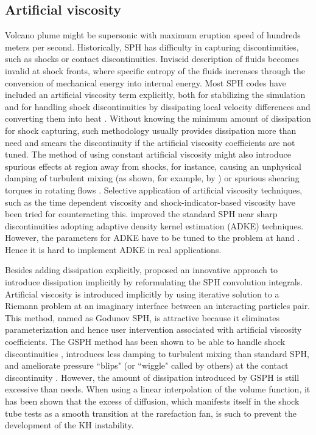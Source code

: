 \subsection{Artificial viscosity}

Volcano plume might be supersonic with maximum eruption speed of hundreds meters per second.
Historically, SPH has difficulty in capturing discontinuities, such as shocks or contact discontinuities. Inviscid description of fluids becomes invalid at shock fronts, where specific entropy of the fluids increases through the conversion of mechanical energy into internal energy. Most SPH codes have included an artificial viscosity term explicitly, both for stabilizing the simulation and for handling shock discontinuities by dissipating local velocity differences and converting them into heat \citep{monaghan1983shock, monaghan1997sph, klapp2012strong}. Without knowing the minimum amount of dissipation for shock capturing, such methodology usually provides dissipation more than need and smears the discontinuity if the artificial viscosity coefficients are not tuned. The method of using constant artificial viscosity might also introduce spurious effects at region away from shocks, for instance, causing an unphysical damping of turbulent mixing (as shown, for example, by \citet{borgani2012hydrodynamic}) or spurious
shearing torques in rotating flows \citep{flebbe1994smoothed}. Selective application of artificial viscosity techniques, such as the time dependent viscosity \citep{morris1997switch, dolag2005turbulent} and shock-indicator-based viscosity \citep{cullen2010inviscid} have been tried for counteracting this. 
\citet{sigalotti2008adaptive} improved the standard SPH near sharp discontinuities adopting adaptive density kernel estimation (ADKE) techniques. However, the parameters for ADKE have to be tuned to the problem at hand \citep{puri2014comparison}. Hence it is hard to implement ADKE in real applications.

Besides adding dissipation explicitly, \citet{inutsuka2002reformulation} proposed an innovative approach to introduce dissipation implicitly by reformulating the SPH convolution integrals. Artificial viscosity is introduced implicitly by using iterative solution to a Riemann problem at an imaginary interface between an interacting particles pair. This method, named as Godunov SPH, is attractive because it eliminates parameterization and hence user intervention associated with artificial viscosity coefficients. The GSPH method has been shown to be able to handle shock discontinuities \citep{inutsuka2002reformulation, cha2003implementations,iwasaki2011smoothed, puri2014approximate}, introduces less damping to turbulent mixing \citep{cha2010kelvin, borgani2012hydrodynamic} than standard SPH, and ameliorate pressure ``blips" (or ``wiggle" called by others) at the contact discontinuity \citep{borgani2012hydrodynamic}. However, the amount of dissipation introduced by GSPH is still excessive than needs. When using a linear interpolation of the volume function, it has been shown \citep{borgani2012hydrodynamic} that the excess of diffusion, which manifests itself in the shock tube tests as a smooth transition at the rarefaction fan, is such to prevent the development of the KH instability.

